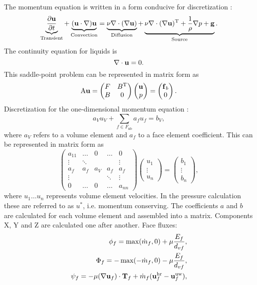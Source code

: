 \documentclass[12pt]{article}
\newcommand{\vb}[1]{\text{\textbf{#1}}}
\newcommand{\T}{\text{T}}
\newcommand{\x}{\text}
\newcommand{\fnb}{F_{\x{nb}}}
\begin{document}
The momentum equation is written in a form conducive for discretization \cite{mou}:
$$
  \underbrace{\frac{\partial \vb u}{\partial t}}_\text{Transient} + \underbrace{(\vb u \cdot \nabla) \vb u}_\text{Convection} = \underbrace{\nu \nabla \cdot (\nabla \vb u)}_\text{Diffusion} + \underbrace{\nu \nabla \cdot (\nabla \vb u)^\T + \frac{1}{\rho} \nabla p + \vb g}_\text{Source}.
$$
The continuity equation for liquids is
$$
\nabla \cdot \vb u = 0.
$$
This saddle-point problem can be represented in matrix form as \cite{mou}
$$
\x A \vb u = \begin{pmatrix}
  F & B^\T \\
  B & 0
\end{pmatrix}
\begin{pmatrix}
  \vb u \\
  p
\end{pmatrix} =
\begin{pmatrix}
  \vb f_b \\
  0
\end{pmatrix}.
$$
Discretization for the one-dimensional momentum equation \cite{mou}:
\begin{equation}
  a_V u_V + \sum_{f \in \fnb} a_f u_f = b_V,
\end{equation}
where $a_V$ refers to a volume element and $a_f$ to a face element coefficient. This can be represented in matrix form as
$$
\begin{pmatrix}
  a_{11} & \dots & 0 & \dots & 0 \\
  \vdots & \ddots & &  & \vdots \\
  a_f & a_f & a_V & a_f & a_f \\
  \vdots & &  & \ddots & \vdots \\
  0 & \dots & 0 & \dots & a_{nn}
\end{pmatrix}
\begin{pmatrix}
  u_1 \\
  \vdots \\
  u_n
\end{pmatrix} =
\begin{pmatrix}
  b_{1} \\
  \vdots \\
  b_n
\end{pmatrix},
$$
where $u_1 \dots u_n$ represents volume element velocities. In the pressure calculation these are referred to as $u^*$, i.e. momentum conserving. The coefficients $a$ and $b$ are calculated for each volume element and assembled into a matrix. Components X, Y and Z are calculated one after another.
Face fluxes:
\begin{align}
  \phi_f = \max(\dot m_f, 0) + \mu \frac{E_f}{d_{vf}}, \\
  \Phi_f = -\max(-\dot m_f, 0) - \mu \frac{E_f}{d_{vf}}, \\
  \psi_f = - \mu (\nabla \vb u_f) \cdot \vb T_f + \dot m_f (\vb u_f^{\text{hr}} - \vb u_f^{\text{uw}}),
\end{align}
\end{document}
